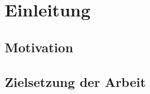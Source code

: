 \chapter{Einleitung}\label{ch:intro}

\section{Motivation}\label{sec:motivation}

\section{Zielsetzung der Arbeit}\label{sec:objective}
